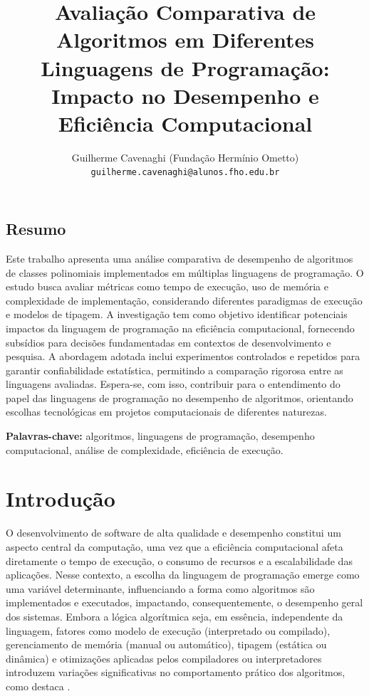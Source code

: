 \documentclass[12pt, a4paper]{article}
\title{Avaliação Comparativa de Algoritmos em Diferentes Linguagens de Programação: Impacto no Desempenho e Eficiência Computacional}
\author{Guilherme Cavenaghi (Fundação Hermínio Ometto) \texttt{guilherme.cavenaghi@alunos.fho.edu.br}}
\date{}
\begin{document}

\maketitle
\vspace{-5em}

\begin{flushleft}
\section*{Resumo}
\noindent Este trabalho apresenta uma análise comparativa de desempenho de algoritmos de classes polinomiais implementados em múltiplas linguagens de programação. O estudo busca avaliar métricas como tempo de execução, uso de memória e complexidade de implementação, considerando diferentes paradigmas de execução e modelos de tipagem. A investigação tem como objetivo identificar potenciais impactos da linguagem de programação na eficiência computacional, fornecendo subsídios para decisões fundamentadas em contextos de desenvolvimento e pesquisa. A abordagem adotada inclui experimentos controlados e repetidos para garantir confiabilidade estatística, permitindo a comparação rigorosa entre as linguagens avaliadas. Espera-se, com isso, contribuir para o entendimento do papel das linguagens de programação no desempenho de algoritmos, orientando escolhas tecnológicas em projetos computacionais de diferentes naturezas.

\vspace{0.2cm}
\noindent\textbf{Palavras-chave:} algoritmos, linguagens de programação, desempenho computacional, análise de complexidade, eficiência de execução.
\end{flushleft}


\section{Introdução}
O desenvolvimento de software de alta qualidade e desempenho constitui um aspecto central da computação, uma vez que a eficiência computacional afeta diretamente o tempo de execução, o consumo de recursos e a escalabilidade das aplicações. Nesse contexto, a escolha da linguagem de programação emerge como uma variável determinante, influenciando a forma como algoritmos são implementados e executados, impactando, consequentemente, o desempenho geral dos sistemas. Embora a lógica algorítmica seja, em essência, independente da linguagem, fatores como modelo de execução (interpretado ou compilado), gerenciamento de memória (manual ou automático), tipagem (estática ou dinâmica) e otimizações aplicadas pelos compiladores ou interpretadores introduzem variações significativas no comportamento prático dos algoritmos, como destaca .
\end{document}
